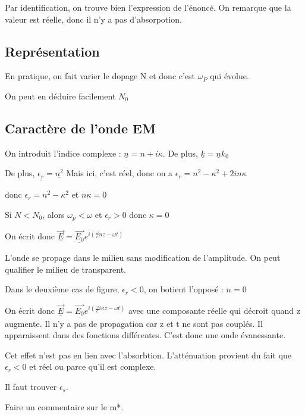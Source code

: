 \documentclass[french]{yLectureNote}
\renewcommand{\vec}{\overrightarrow}
\begin{document}
Par identification, on trouve bien l'expression de l'énoncé. On remarque que la valeur est réelle, donc il n'y a pas d'absorpotion.
\subsection{Représentation}
En pratique, on fait varier le dopage N et donc c'est $\omega_P$ qui évolue.

On peut en déduire facilement $N_0$
\subsection{Caractère de l'onde EM}
On introduit l'indice complexe : $\underline{n} = n+i\kappa$. De plus, $\underline{k} = \underline{n}k_0$

De plus, $\underline{\epsilon_r} = \underline{n^2}$ Mais ici, c'est réel, donc on a $\epsilon_r = n^2-\kappa^2+2in\kappa$

donc $\epsilon_r = n^2-\kappa^2$ et $n\kappa=0$

Si $N<N_0$, alors $\omega_p<\omega$ et $\epsilon_r>0$ donc $\kappa=0$

On écrit donc $\underline{\vec{E}} = \underline{\vec{E_0}}e^{i(\frac{\omega}{c}nz-\omega t)}$

L'onde se propage dans le milieu sans modification de l'amplitude. On peut qualifier le milieu de transparent.

Dans le deuxième cas de figure, $\epsilon_r < 0$, on botient l'opposé : $n=0$

On écrit donc $\underline{\vec{E}} = \underline{\vec{E_0}}e^{i(\frac{\omega}{c}i\kappa z-\omega t)}$ avec une composante réelle qui décroit quand z augmente. Il n'y a pas de propagation car z et t ne sont pas couplés. 
Il apparaissent dans des fonctions différentes. C'est donc une onde évanessante.

Cet effet n'est pas en lien avec l'absorbtion. L'atténuation provient du fait que $\epsilon_r <0$ et réel ou parce qu'il est complexe.

Il faut trouver $\epsilon_s$. 

Faire un commentaire sur le m*.
\end{document}
